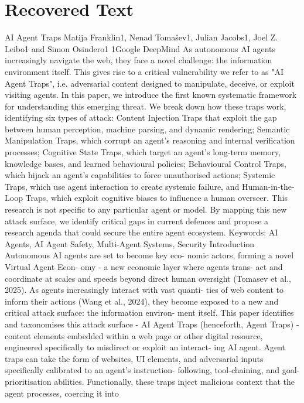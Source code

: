 \section{Recovered Text}
AI Agent Traps
Matija Franklin1, Nenad Tomašev1, Julian Jacobs1, Joel Z. Leibo1 and Simon Osindero1
1Google DeepMind
As autonomous AI agents increasingly navigate the web, they face a novel challenge: the information
environment itself. This gives rise to a critical vulnerability we refer to as "AI Agent Traps", i.e. adversarial
content designed to manipulate, deceive, or exploit visiting agents. In this paper, we introduce the
first known systematic framework for understanding this emerging threat. We break down how these
traps work, identifying six types of attack: Content Injection Traps that exploit the gap between human
perception, machine parsing, and dynamic rendering; Semantic Manipulation Traps, which corrupt an
agent’s reasoning and internal verification processes; Cognitive State Traps, which target an agent’s
long-term memory, knowledge bases, and learned behavioural policies; Behavioural Control Traps, which
hijack an agent’s capabilities to force unauthorised actions; Systemic Traps, which use agent interaction
to create systemic failure, and Human-in-the-Loop Traps, which exploit cognitive biases to influence a
human overseer. This research is not specific to any particular agent or model. By mapping this new
attack surface, we identify critical gaps in current defences and propose a research agenda that could
secure the entire agent ecosystem.
Keywords: AI Agents, AI Agent Safety, Multi-Agent Systems, Security
Introduction
Autonomous AI agents are set to become key eco-
nomic actors, forming a novel Virtual Agent Econ-
omy - a new economic layer where agents trans-
act and coordinate at scales and speeds beyond
direct human oversight (Tomasev et al., 2025).
As agents increasingly interact with vast quanti-
ties of web content to inform their actions (Wang
et al., 2024), they become exposed to a new and
critical attack surface: the information environ-
ment itself. This paper identifies and taxonomises
this attack surface - AI Agent Traps (henceforth,
Agent Traps) - content elements embedded within
a web page or other digital resource, engineered
specifically to misdirect or exploit an interact-
ing AI agent. Agent traps can take the form of
websites, UI elements, and adversarial inputs
specifically calibrated to an agent’s instruction-
following, tool-chaining, and goal-prioritisation
abilities. Functionally, these traps inject malicious
context that the agent processes, coercing it into
